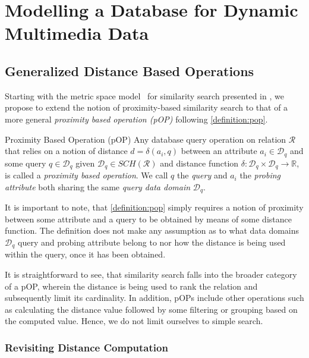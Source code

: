 \chapter{Modelling a Database for Dynamic Multimedia Data}
\label{chapter:system_model}

\section{Generalized Distance Based Operations}

Starting with the metric space model~\cite{Zezula:2006similarity} for similarity search presented in , we propose to extend the notion of proximity-based similarity search to that of a more general \emph{proximity based operation (pOP)} following \cref{definition:pop}.

\begin{definition}[label=definition:pop]{Proximity Based Operation (pOP)}{}
    Any database query operation on relation $\mathcal{R}$ that relies on a notion of distance $d = \delta(a_{i}, q)$ between an attribute $a_{i} \in \mathcal{D}_q$ and some query $q \in \mathcal{D}_q$ given $\mathcal{D}_q \in SCH(\mathcal{R})$ and distance function $\delta: \mathcal{D}_q \times \mathcal{D}_q \rightarrow \mathbb{R}$, is called a \emph{proximity based operation}. We call $q$ the \emph{query} and $a_i$ the \emph{probing attribute} both sharing the same \emph{query data domain} $\mathcal{D}_q$.
\end{definition}

It is important to note, that \cref{definition:pop} simply requires a notion of proximity between some attribute and a query to be obtained by means of some distance function. The definition does not make any assumption as to what data domains $\mathcal{D}_q$ query and probing attribute belong to nor how the distance is being used within the query, once it has been obtained. 

It is straightforward to see, that similarity search falls into the broader category of a pOP, wherein the distance is being used to rank the relation and subsequently limit its cardinality. In addition, pOPs include other operations such as calculating the distance value followed by some filtering or grouping based on the computed value. Hence, we do not limit ourselves to simple search.

\subsection{Revisiting Distance Computation}

